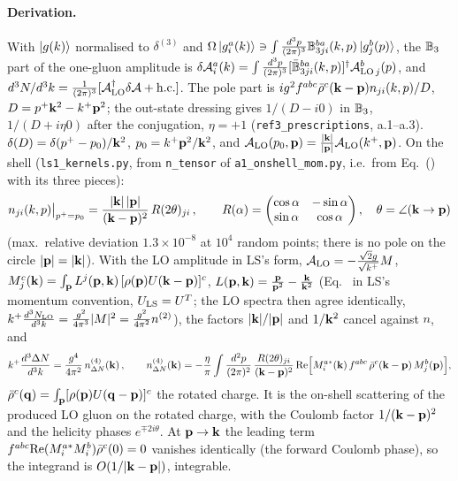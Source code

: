 \paragraph{Derivation.} With $\ket{g(k)}$ normalised to $\delta^{(3)}$ and $\Omega\ket{g^a_i(k)}\ni\int\frac{d^3p}{(2\pi)^3}\mathbb{B}^{ba}_{3ji}(k,p)\ket{g^b_j(p)}$, the $\mathbb{B}_3$ part of the one-gluon amplitude is $\delta\mathcal A^a_i(k)=\int\frac{d^3p}{(2\pi)^3}[\bar{\mathbb{B}}^{ba}_{3ji}(k,p)]^\dagger\mathcal A^b_{{\rm LO}\,j}(p)$, and $d^3N/d^3k=\frac{1}{(2\pi)^3}[\mathcal A^\dagger_{\rm LO}\delta\mathcal A+{\rm h.c.}]$. The pole part is $ig^2f^{abc}\bar\rho^c(\mathbf{k}-\mathbf{p})n_{ji}(k,p)/D$, $D=p^+\mathbf{k}^2-k^+\mathbf{p}^2$; the out-state dressing gives $1/(D-i0)$ in $\mathbb{B}_3$, $1/(D+i\eta0)$ after the conjugation, $\eta=+1$ (\texttt{ref3\_prescriptions}, a.1--a.3). $\delta(D)=\delta(p^+-p_0)/\mathbf{k}^2$, $p_0=k^+\mathbf{p}^2/\mathbf{k}^2$, and $\mathcal A_{\rm LO}(p_0,\mathbf{p})=\frac{|\mathbf{k}|}{|\mathbf{p}|}\mathcal A_{\rm LO}(k^+,\mathbf{p})$. On the shell (\texttt{ls1\_kernels.py}, from \texttt{n\_tensor} of \texttt{a1\_onshell\_mom.py}, i.e.\ from Eq.~() with its three pieces):
\begin{align}\label{ls:n}
n_{ji}(k,p)\big|_{p^+=p_0}=\frac{|\mathbf{k}|\,|\mathbf{p}|}{(\mathbf{k}-\mathbf{p})^2}\,R(2\theta)_{ji}\,,\qquad R(\alpha)=\begin{pmatrix}\cos\alpha&-\sin\alpha\\ \sin\alpha&\cos\alpha\end{pmatrix},\quad\theta=\angle(\mathbf{k}\to\mathbf{p})
\end{align}
(max.\ relative deviation $1.3\times10^{-8}$ at $10^4$ random points; there is no pole on the circle $|\mathbf{p}|=|\mathbf{k}|$). With the LO amplitude in LS's form, $\mathcal A_{\rm LO}=-\frac{\sqrt2g}{\sqrt{k^+}}M$, $M^c_j(\mathbf{k})=\int_{\mathbf{p}}L^j(\mathbf{p},\mathbf{k})\,[\rho(\mathbf{p})U(\mathbf{k}-\mathbf{p})]^c$, $L(\mathbf{p},\mathbf{k})=\frac{\mathbf{p}}{\mathbf{p}^2}-\frac{\mathbf{k}}{\mathbf{k}^2}$ (Eq.~ in LS's momentum convention, $U_{\rm LS}=U^T$; the LO spectra then agree identically, $k^+\frac{d^3N_{\rm LO}}{d^3k}=\frac{g^2}{4\pi^3}|M|^2=\frac{g^2}{4\pi^2}n^{(2)}$), the factors $|\mathbf{k}|/|\mathbf{p}|$ and $1/\mathbf{k}^2$ cancel against $n$, and
\begin{align}\label{ls:DNmom}
k^+\frac{d^3\Delta N}{d^3k}=\frac{g^4}{4\pi^2}\,n^{(4)}_{\Delta N}(\mathbf{k})\,,\qquad
n^{(4)}_{\Delta N}(\mathbf{k})=-\frac{\eta}{\pi}\int\frac{d^2p}{(2\pi)^2}\,\frac{R(2\theta)_{ji}}{(\mathbf{k}-\mathbf{p})^2}\,{\rm Re}\Big[M^{a*}_i(\mathbf{k})\,f^{abc}\,\bar\rho^c(\mathbf{k}-\mathbf{p})\,M^b_j(\mathbf{p})\Big],
\end{align}
$\bar\rho^c(\mathbf{q})=\int_{\mathbf{p}}[\rho(\mathbf{p})U(\mathbf{q}-\mathbf{p})]^c$ the rotated charge. It is the on-shell scattering of the produced LO gluon on the rotated charge, with the Coulomb factor $1/(\mathbf{k}-\mathbf{p})^2$ and the helicity phases $e^{\mp2i\theta}$. At $\mathbf{p}\to\mathbf{k}$ the leading term $f^{abc}{\rm Re}(M^{a*}_iM^b_i)\bar\rho^c(0)=0$ vanishes identically (the forward Coulomb phase), so the integrand is $O(1/|\mathbf{k}-\mathbf{p}|)$, integrable.
